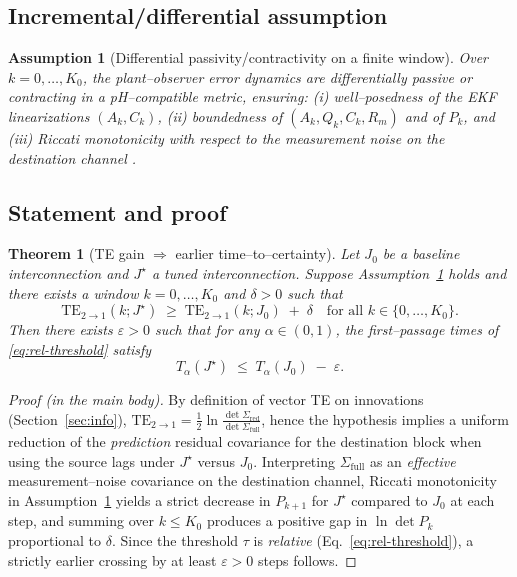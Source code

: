 \documentclass[final,5p,times,twocolumn]{elsarticle}
\newtheorem{theorem}{Theorem}
\newtheorem{assumption}{Assumption}
\begin{document}
\subsection{Incremental/differential assumption}
\begin{assumption}[Differential passivity/contractivity on a finite window]\label{ass:diff}
	Over \(k=0,\dots,K_0\), the plant--observer error dynamics are differentially passive or contracting in a pH--compatible metric, ensuring: (i) well--posedness of the EKF linearizations \((A_k,C_k)\), (ii) boundedness of \((A_k,Q_k,C_k,R_m)\) and of \(P_k\), and (iii) Riccati monotonicity with respect to the measurement noise on the destination channel \citep{LohmillerSlotine1998,ForniSepulchre2014_TAC}.
\end{assumption}

\subsection{Statement and proof}
\begin{theorem}[TE gain \(\Rightarrow\) earlier time--to--certainty]\label{thm:main}
	Let \(J_0\) be a baseline interconnection and \(J^\star\) a tuned interconnection. Suppose Assumption~\ref{ass:diff} holds and there exists a window \(k=0,\dots,K_0\) and \(\delta>0\) such that
	\[
	\mathrm{TE}_{2\to1}(k;J^\star)\;\ge\;\mathrm{TE}_{2\to1}(k;J_0)\;+\;\delta
	\quad\text{for all }k\in\{0,\dots,K_0\}.
	\]
	Then there exists \(\varepsilon>0\) such that for any \(\alpha\in(0,1)\), the first--passage times of \eqref{eq:rel-threshold} satisfy
	\[
	T_\alpha(J^\star) \;\le\; T_\alpha(J_0)\;-\;\varepsilon.
	\]
\end{theorem}

\begin{proof}[Proof (in the main body)]
	By definition of vector TE on innovations (Section~\ref{sec:info}), \(\mathrm{TE}_{2\to1}=\frac12\ln\frac{\det\Sigma_{\mathrm{red}}}{\det\Sigma_{\mathrm{full}}}\), hence the hypothesis implies a uniform reduction of the \emph{prediction} residual covariance for the destination block when using the source lags under \(J^\star\) versus \(J_0\). Interpreting \(\Sigma_{\mathrm{full}}\) as an \emph{effective} measurement--noise covariance on the destination channel, Riccati monotonicity in Assumption~\ref{ass:diff} yields a strict decrease in \(P_{k+1}\) for \(J^\star\) compared to \(J_0\) at each step, and summing over \(k\le K_0\) produces a positive gap in \(\ln\det P_k\) proportional to \(\delta\). Since the threshold \(\tau\) is \emph{relative} (Eq.~\eqref{eq:rel-threshold}), a strictly earlier crossing by at least \(\varepsilon>0\) steps follows.
\end{proof}
\end{document}
